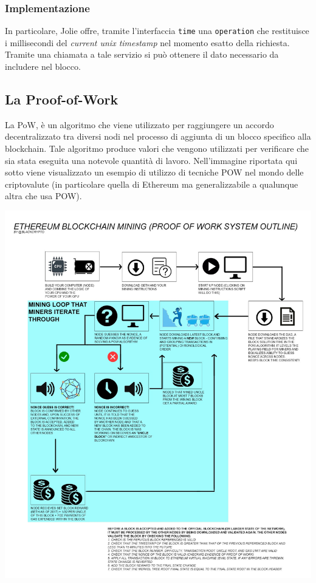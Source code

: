 \subsubsection{Implementazione}
In particolare, Jolie offre, tramite l'interfaccia \texttt{time} una \texttt{operation} che restituisce i millisecondi del \textit{current unix timestamp} nel momento esatto della richiesta. Tramite una chiamata a tale servizio si può ottenere il dato necessario da includere nel blocco.
%

%

\subsection{La Proof-of-Work}
La PoW, è un algoritmo che viene utilizzato per raggiungere un accordo decentralizzato tra diversi nodi nel processo di aggiunta di un blocco specifico alla blockchain.
Tale algoritmo produce valori che vengono utilizzati per verificare che sia stata eseguita una notevole quantità di lavoro. Nell'immagine riportata qui sotto viene visualizzato un esempio di utilizzo di tecniche POW nel mondo delle criptovalute (in particolare quella di Ethereum ma generalizzabile a qualunque altra che usa POW).
\begin{center}
    \includegraphics[width=\linewidth]{img/pow}
\end{center}

